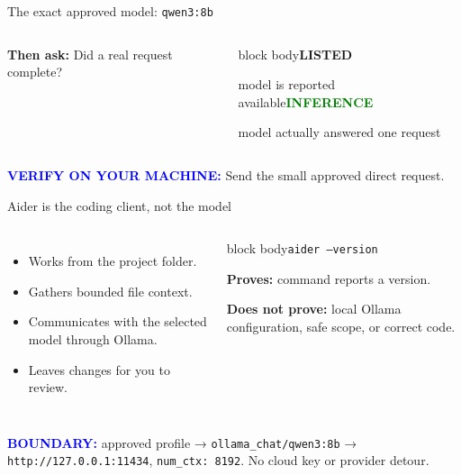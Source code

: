 \documentclass[aspectratio=169,11pt]{beamer}
\begin{document}
\begin{frame}{The exact approved model: \texttt{qwen3:8b}}\begin{columns}[T]\par\textbf{Then ask:} Did a real request complete?\begin{beamercolorbox}[sep=.7em,wd=\linewidth]{block body}\textcolor{gold!80!black}{\textbf{LISTED}}\par model is reported available\vspace{.3cm}\textcolor{green}{\textbf{INFERENCE}}\par model actually answered one request\end{beamercolorbox}\end{columns}\vspace{.45cm}\textcolor{blue}{\textbf{VERIFY ON YOUR MACHINE:}} Send the small approved direct request.\par{}\end{frame}
\begin{frame}{Aider is the coding client, not the model}\begin{columns}[T]\begin{itemize}\item Works from the project folder.\item Gathers bounded file context.\item Communicates with the selected model through Ollama.\item Leaves changes for you to review.\end{itemize}\begin{beamercolorbox}[sep=.7em,wd=\linewidth]{block body}\texttt{aider --version}\par\vspace{.25cm}\textbf{Proves:} command reports a version.\par\vspace{.25cm}\textbf{Does not prove:} local Ollama configuration, safe scope, or correct code.\end{beamercolorbox}\end{columns}\vfill\textcolor{blue}{\textbf{BOUNDARY:}} approved profile → \texttt{ollama\_chat/qwen3:8b} → \texttt{http://127.0.0.1:11434}, \texttt{num\_ctx: 8192}. No cloud key or provider detour.\end{frame}
\end{document}
